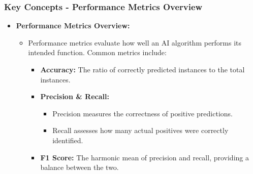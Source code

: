 \documentclass[aspectratio=169]{beamer}
\begin{document}
\begin{frame}[fragile]
    \frametitle{Key Concepts - Performance Metrics Overview}
    \begin{itemize}
        \item \textbf{Performance Metrics Overview:}
        \begin{itemize}
            \item Performance metrics evaluate how well an AI algorithm performs its intended function. Common metrics include:
            \begin{itemize}
                \item \textbf{Accuracy:} The ratio of correctly predicted instances to the total instances.
                \item \textbf{Precision \& Recall:}
                \begin{itemize}
                    \item Precision measures the correctness of positive predictions.
                    \item Recall assesses how many actual positives were correctly identified.
                \end{itemize}
                \item \textbf{F1 Score:} The harmonic mean of precision and recall, providing a balance between the two.
            \end{itemize}
        \end{itemize}
    \end{itemize}
\end{frame}
\end{document}
